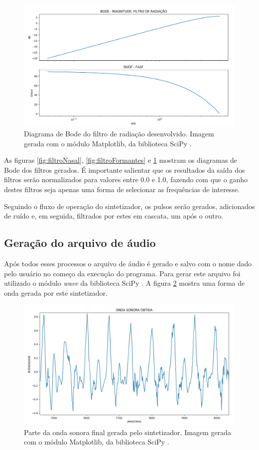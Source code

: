 \documentclass[
  12pt,       
  openright,      
  twoside,      
  a4paper,      
  english,      
  french,       
  spanish,      
  brazil,     
  ]{abntex2}
\begin{document}
\begin{figure}
\includegraphics[width=\textwidth,keepaspectratio]{imagens/bode_radiacao.PNG}
\caption{Diagrama de Bode do filtro de radiação desenvolvido. Imagem gerada com o módulo Matplotlib, da biblioteca SciPy \cite{scipy}.}
\label{fig:filtroRadiacao}
\end{figure}

As figuras \ref{fig:filtroNasal}, \ref{fig:filtroFormantes} e \ref{fig:filtroRadiacao} mostram os diagramas de Bode dos filtros gerados. É importante salientar que os resultados da saída dos filtros serão normalizados para valores entre 0.0 e 1.0, fazendo com que o ganho destes filtros seja apenas uma forma de selecionar as frequências de interesse.

Seguindo o fluxo de operação do sintetizador, os pulsos serão gerados, adicionados de ruído e, em seguida, filtrados por estes em cascata, um após o outro.

\subsection{Geração do arquivo de áudio}
Após todos esses processos o arquivo de áudio é gerado e salvo com o nome dado pelo usuário no começo da execução do programa. Para gerar este arquivo foi utilizado o módulo \textit{wave} da biblioteca SciPy \cite{scipy}. A figura \ref{fig:ondaGerada} mostra uma forma de onda gerada por este sintetizador.

\begin{figure}
\includegraphics[width=\textwidth,keepaspectratio]{imagens/onda_gerada.PNG}
\caption{Parte da onda sonora final gerada pelo sintetizador. Imagem gerada com o módulo Matplotlib, da biblioteca SciPy \cite{scipy}.}
\label{fig:ondaGerada}
\end{figure}
\end{document}

